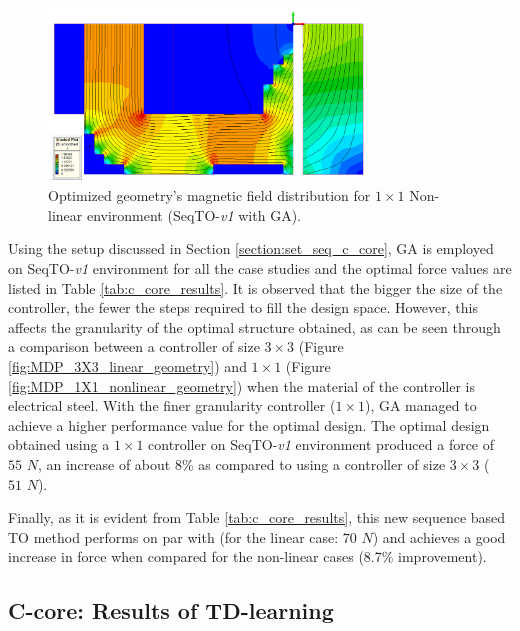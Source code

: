 \begin{figure}[h!]
    \centering
    \includegraphics[width=0.75\textwidth]{Figures/Ch_MDP/55.8.png}
    \caption{Optimized geometry's magnetic field distribution for $1 \times 1$ Non-linear environment (SeqTO-\textit{v1} with GA).}
    \label{fig:MDP_1X1_nonlinear_Bfields}
\end{figure}

Using the setup discussed in Section \ref{section:set_seq_c_core}, GA is employed on SeqTO-\textit{v1} environment for all the case studies and the optimal force values are listed in Table \ref{tab:c_core_results}. It is observed that the bigger the size of the controller, the fewer the steps required to fill the design space. However, this affects the granularity of the optimal structure obtained, as can be seen through a comparison between a controller of size $3 \times 3$ (Figure \ref{fig:MDP_3X3_linear_geometry}) and $1 \times 1$ (Figure \ref{fig:MDP_1X1_nonlinear_geometry})  when the material of the controller is electrical steel. With the finer granularity controller ($1 \times 1$), GA managed to achieve a higher performance value for the optimal design. The optimal design obtained using a $1 \times 1$ controller on SeqTO-\textit{v1} environment produced a force of $55 \hspace{4pt} N$, an increase of about 8\% as compared to using a controller of size $3 \times 3$ ($51 \hspace{4pt} N$). 


Finally, as it is evident from Table \ref{tab:c_core_results}, this new sequence based TO method performs on par with \cite{midha2019selection} (for the linear case: $70 \hspace{4pt} N$) and achieves a good increase in force when compared for the non-linear cases (8.7\% improvement).

\subsection{C-core: Results of TD-learning}

